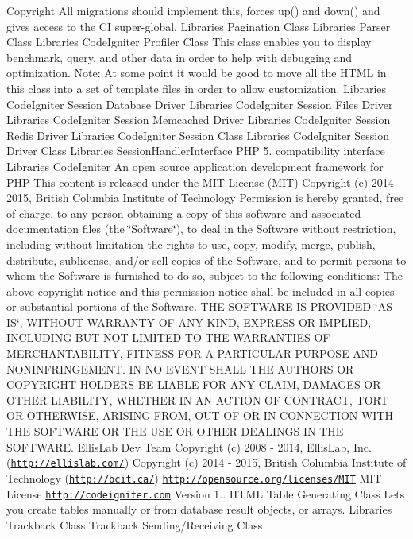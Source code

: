 \begin{DoxyCopyright}{Copyright}
All migrations should implement this, forces up() and down() and gives access to the C\+I super-\/global.  Libraries Pagination Class  Libraries Parser Class  Libraries Code\+Igniter Profiler Class This class enables you to display benchmark, query, and other data in order to help with debugging and optimization. Note\+: At some point it would be good to move all the H\+T\+M\+L in this class into a set of template files in order to allow customization.  Libraries Code\+Igniter Session Database Driver  Libraries Code\+Igniter Session Files Driver  Libraries Code\+Igniter Session Memcached Driver  Libraries Code\+Igniter Session Redis Driver  Libraries Code\+Igniter Session Class  Libraries Code\+Igniter Session Driver Class  Libraries Session\+Handler\+Interface P\+H\+P 5. compatibility interface  Libraries Code\+Igniter An open source application development framework for P\+H\+P This content is released under the M\+I\+T License (M\+I\+T) Copyright (c) 2014 -\/ 2015, British Columbia Institute of Technology Permission is hereby granted, free of charge, to any person obtaining a copy of this software and associated documentation files (the \char`\"{}\+Software\char`\"{}), to deal in the Software without restriction, including without limitation the rights to use, copy, modify, merge, publish, distribute, sublicense, and/or sell copies of the Software, and to permit persons to whom the Software is furnished to do so, subject to the following conditions\+: The above copyright notice and this permission notice shall be included in all copies or substantial portions of the Software. T\+H\+E S\+O\+F\+T\+W\+A\+R\+E I\+S P\+R\+O\+V\+I\+D\+E\+D \char`\"{}\+A\+S I\+S\char`\"{}, W\+I\+T\+H\+O\+U\+T W\+A\+R\+R\+A\+N\+T\+Y O\+F A\+N\+Y K\+I\+N\+D, E\+X\+P\+R\+E\+S\+S O\+R I\+M\+P\+L\+I\+E\+D, I\+N\+C\+L\+U\+D\+I\+N\+G B\+U\+T N\+O\+T L\+I\+M\+I\+T\+E\+D T\+O T\+H\+E W\+A\+R\+R\+A\+N\+T\+I\+E\+S O\+F M\+E\+R\+C\+H\+A\+N\+T\+A\+B\+I\+L\+I\+T\+Y, F\+I\+T\+N\+E\+S\+S F\+O\+R A P\+A\+R\+T\+I\+C\+U\+L\+A\+R P\+U\+R\+P\+O\+S\+E A\+N\+D N\+O\+N\+I\+N\+F\+R\+I\+N\+G\+E\+M\+E\+N\+T. I\+N N\+O E\+V\+E\+N\+T S\+H\+A\+L\+L T\+H\+E A\+U\+T\+H\+O\+R\+S O\+R C\+O\+P\+Y\+R\+I\+G\+H\+T H\+O\+L\+D\+E\+R\+S B\+E L\+I\+A\+B\+L\+E F\+O\+R A\+N\+Y C\+L\+A\+I\+M, D\+A\+M\+A\+G\+E\+S O\+R O\+T\+H\+E\+R L\+I\+A\+B\+I\+L\+I\+T\+Y, W\+H\+E\+T\+H\+E\+R I\+N A\+N A\+C\+T\+I\+O\+N O\+F C\+O\+N\+T\+R\+A\+C\+T, T\+O\+R\+T O\+R O\+T\+H\+E\+R\+W\+I\+S\+E, A\+R\+I\+S\+I\+N\+G F\+R\+O\+M, O\+U\+T O\+F O\+R I\+N C\+O\+N\+N\+E\+C\+T\+I\+O\+N W\+I\+T\+H T\+H\+E S\+O\+F\+T\+W\+A\+R\+E O\+R T\+H\+E U\+S\+E O\+R O\+T\+H\+E\+R D\+E\+A\+L\+I\+N\+G\+S I\+N T\+H\+E S\+O\+F\+T\+W\+A\+R\+E.  Ellis\+Lab Dev Team  Copyright (c) 2008 -\/ 2014, Ellis\+Lab, Inc. (\href{http://ellislab.com/}{\tt http\+://ellislab.\+com/})  Copyright (c) 2014 -\/ 2015, British Columbia Institute of Technology (\href{http://bcit.ca/}{\tt http\+://bcit.\+ca/})  \href{http://opensource.org/licenses/MIT}{\tt http\+://opensource.\+org/licenses/\+M\+I\+T} M\+I\+T License  \href{http://codeigniter.com}{\tt http\+://codeigniter.\+com}  Version 1..  H\+T\+M\+L Table Generating Class Lets you create tables manually or from database result objects, or arrays.  Libraries Trackback Class Trackback Sending/\+Receiving Class  
\end{DoxyCopyright}
